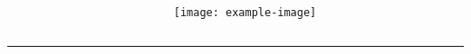 \documentclass{beamer}
\begin{document}
  \begin{frame}{}
    \begin{columns}[onlytextwidth]
            \begin{column}{.45\textwidth}
            \end{column}
            \begin{column}{.45\textwidth}
                \texttt{[image: example-image]}
            \end{column}            
    \end{columns}
    \rule{\textwidth}{1pt}
  \end{frame}
\end{document}
